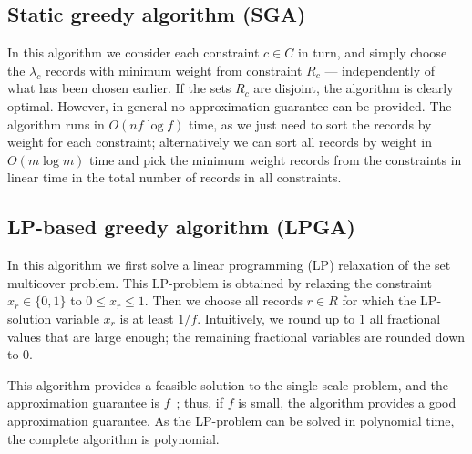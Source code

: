\subsection{Static greedy algorithm (SGA)}
\label{sec:algorithms:sga}

In this algorithm we consider each constraint $c \in C$ in turn, and simply choose the $\lambda_c$ records with minimum weight from constraint $R_c$ --- independently of what has been chosen earlier. If the sets $R_c$ are disjoint, the algorithm is clearly optimal. However, in general no approximation guarantee can be provided. The algorithm runs in $O(n f \log f)$ time, as we just need to sort the records by weight for each constraint; alternatively we can sort all records by weight in $O(m \log m)$ time and pick the minimum weight records from the constraints in linear time in the total number of records in all constraints.

\subsection{LP-based greedy algorithm (LPGA)}
\label{sec:algorithms:lpga}

In this algorithm we first solve a linear programming (LP) relaxation of the set multicover problem. This LP-problem is obtained by relaxing the constraint $x_r \in \{0, 1\}$ to $0 \leq x_r \leq 1$. Then we choose all records $r \in R$ for which the LP-solution variable $x_r$ is at least $1 / f$. Intuitively, we round up to 1 all fractional values that are large enough; the remaining fractional variables are rounded down to 0. 

This algorithm provides a feasible solution to the single-scale problem, and the approximation guarantee is $f$~\cite{seevaziranibookforreference}; thus, if $f$ is small, the algorithm provides a good approximation guarantee. As the LP-problem can be solved in polynomial time, the complete algorithm is polynomial.




